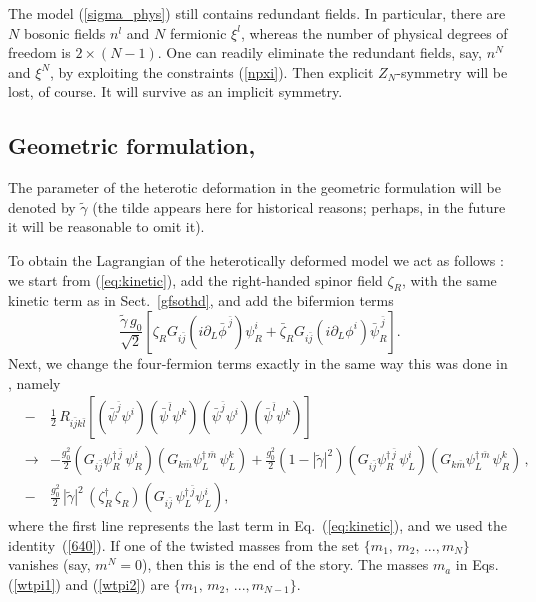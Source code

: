 \documentclass[epsfig,12pt]{article}
\def\beq{\begin{equation}}
\def\eeq{\end{equation}}
\def\beqn{\begin{eqnarray}}
\def\eeqn{\end{eqnarray}}
\newcommand{\pt}{\partial}
\newcommand{\zn}{$Z_N$}
\def\beqn{\begin{eqnarray}}
\def\eeqn{\end{eqnarray}}
\def\beq{\begin{equation}}
\def\eeq{\end{equation}}
\begin{document}
	The model (\ref{sigma_phys}) still contains redundant fields.
	In particular, there are $N$ bosonic fields $n^l$ and $N$ fermionic $\xi^l$,
	whereas the number of physical degrees of 
	freedom is $2\times(N-1)$. 
	One can readily eliminate the redundant fields, say, $n^N$ and $\xi^N$,
	by exploiting the constraints (\ref{npxi}). Then explicit \zn-symmetry will be lost, of course.
	It will survive as an implicit symmetry.

\subsection{Geometric formulation, } 
\label{gftgnz}

The parameter of the heterotic deformation in the geometric formulation will be denoted by
$\tilde \gamma$ (the tilde appears here for historical reasons;
perhaps, in the future it will be reasonable to omit it).

To obtain the Lagrangian of the heterotically deformed model
we act as follows \cite{BSY3}: we start from (\ref{eq:kinetic}), add the
 right-handed spinor field $\zeta_R$, with the same kinetic term as in Sect.~\ref{gfsothd}, and
 add the bifermion terms
 \beq
 \frac{\tilde\gamma \,g_0}{\sqrt 2}
 \left[\zeta_RG_{i\bar j}\left(i\pt_L\bar\phi^{\,\bar j}
 \right)\psi_R^i + \bar\zeta_R G_{i\bar j}\left(i\pt_L\phi^{i}
 \right)\bar\psi_R^{\,\bar j} 
 \right].
 \eeq
Next, we change the four-fermion terms exactly in the same way this was done in
 \cite{SY1},
 namely
 \beqn
&-&\frac{1}{2} \,R_{i\bar jk\bar l}\left[\left(\bar\psi^{\bar j}\psi^{i}\right)\left(\bar\psi^{\bar l}\psi^{k}\right)
\left(\bar\psi^{\bar j}\psi^{i}\right)\left(\bar\psi^{\bar l}\psi^{k}\right)
\right]
\nonumber\\[3mm]
&\to&
- \frac{g_0^2}{2}\left( G_{i\bar j}\psi^{\dagger\, \bar j}_R\, \psi^{ i}_R\right)
\left( G_{k\bar m}\psi^{\dagger\, \bar m}_L\, \psi^{ k}_L\right)+
\frac{g_0^2}{2}\left(1-|\tilde\gamma|^2\right)
\left( G_{i\bar j}\psi^{\dagger\, \bar j}_R\, \psi^{ i}_L\right)
\left( G_{k\bar m}\psi^{\dagger\, \bar m}_L\, \psi^{ k}_R\right)\,,
\nonumber
\\[4mm]
&-&
 \frac{g_0^2}{2} \, |\tilde{\gamma} |^2 \,\left(\zeta_R^\dagger\, \zeta_R
\right)\left(G_{i\bar j}\,  \psi_L^{\dagger\,\bar j}\psi_L^i\right),
\eeqn
 where the first line represents the last term in Eq.~(\ref{eq:kinetic}), and we used the identity~(\ref{640}).
 If one of the twisted masses from the set  $\{m_1,\,m_2,\, ..., m_N\}$ vanishes (say, $m^N=0$),
then this is the end of the story. The masses 
$m_a$ in Eqs. (\ref{wtpi1}) and (\ref{wtpi2}) are $\{m_1,\,m_2,\, ..., m_{N-1}\}$.
\end{document}
